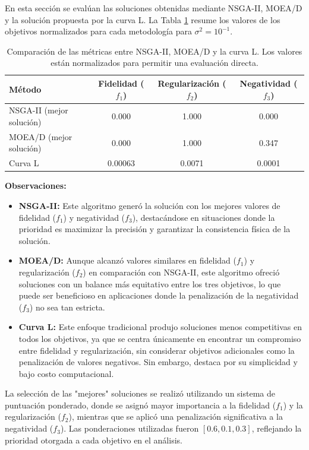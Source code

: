 En esta sección se evalúan las soluciones obtenidas mediante NSGA-II, MOEA/D y la solución propuesta por la curva L. La Tabla \ref{tab:comparison_algorithms} resume los valores de los objetivos normalizados para cada metodología para \( \sigma^2 = 10^{-1} \).

\begin{table}[h]
    \centering
    \begin{tabular}{lccc}
        \toprule
        \textbf{Método} & \textbf{Fidelidad (\( f_1 \))} & \textbf{Regularización (\( f_2 \))} & \textbf{Negatividad (\( f_3 \))} \\
        \midrule
        NSGA-II (mejor solución) & 0.000 & 1.000 & 0.000 \\
        MOEA/D (mejor solución) & 0.000 & 1.000 & 0.347 \\
        Curva L & 0.00063 & 0.0071 & 0.0001 \\
        \bottomrule
    \end{tabular}
    \caption{Comparación de las métricas entre NSGA-II, MOEA/D y la curva L. Los valores están normalizados para permitir una evaluación directa.}
    \label{tab:comparison_algorithms}
\end{table}

\noindent
\textbf{Observaciones:}
\begin{itemize}
    \item \textbf{NSGA-II:} Este algoritmo generó la solución con los mejores valores de fidelidad (\( f_1 \)) y negatividad (\( f_3 \)), destacándose en situaciones donde la prioridad es maximizar la precisión y garantizar la consistencia física de la solución.
    \item \textbf{MOEA/D:} Aunque alcanzó valores similares en fidelidad (\( f_1 \)) y regularización (\( f_2 \)) en comparación con NSGA-II, este algoritmo ofreció soluciones con un balance más equitativo entre los tres objetivos, lo que puede ser beneficioso en aplicaciones donde la penalización de la negatividad (\( f_3 \)) no sea tan estricta.
    \item \textbf{Curva L:} Este enfoque tradicional produjo soluciones menos competitivas en todos los objetivos, ya que se centra únicamente en encontrar un compromiso entre fidelidad y regularización, sin considerar objetivos adicionales como la penalización de valores negativos. Sin embargo, destaca por su simplicidad y bajo costo computacional.
\end{itemize}

La selección de las "mejores" soluciones se realizó utilizando un sistema de puntuación ponderado, donde se asignó mayor importancia a la fidelidad (\( f_1 \)) y la regularización (\( f_2 \)), mientras que se aplicó una penalización significativa a la negatividad (\( f_3 \)). Las ponderaciones utilizadas fueron \([0.6, 0.1, 0.3]\), reflejando la prioridad otorgada a cada objetivo en el análisis.

